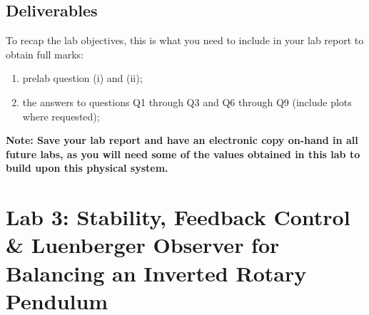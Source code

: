 \documentclass[12pt]{report}
\begin{document}
\subsection{Deliverables}
To recap the lab objectives, this is what you need to include in your lab report to obtain full marks:
\begin{enumerate}
    \item prelab question (i) and (ii);
    \item the answers to questions Q1 through Q3 and Q6 through Q9 (include plots where requested);
\end{enumerate}
\textbf{Note: Save your lab report and have an electronic copy on-hand in all future labs, as you will need some of the values obtained in this lab to build upon this physical system.}
\newpage
\section{Lab 3: Stability, Feedback Control \& Luenberger Observer for Balancing an Inverted Rotary Pendulum} \label{section:lab3}
\end{document}

